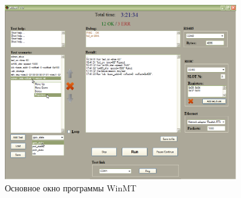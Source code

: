 \documentclass[a4paper,14pt,bachelor]{disser}
\begin{document}
\begin{figure}[h!] %
\addtocounter{myfigs}{1}
 \begin{center}
 \includegraphics[width=0.9\textwidth]{winmt-1}
 \caption{\label{winmt-1} Основное окно программы WinMT}
 \end{center}
\end{figure}
\end{document}
